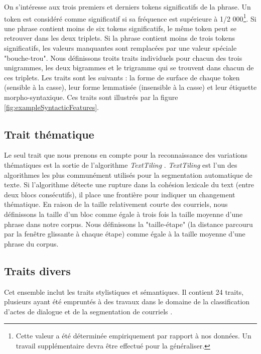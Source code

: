 On s'intéresse aux trois premiers et derniers tokens significatifs de la phrase. Un token est considéré comme significatif si sa fréquence est supérieure à 1/2 000\footnote{Cette valeur a été déterminée empiriquement par rapport à nos données. Un travail supplémentaire devra être effectué pour la généraliser.}. Si une phrase contient moins de six tokens significatifs, le même token peut se retrouver dans les deux triplets. Si la phrase contient moins de trois tokens significatifs, les valeurs manquantes sont remplacées par une valeur spéciale "bouche-trou". Nous définissons troits traits individuels pour chacun des trois unigrammes, les deux bigrammes et le trigramme qui se trouvent dans chacun de ces triplets. Les traits sont les suivants : la forme de surface de chaque token (sensible à la casse), leur forme lemmatisée (insensible à la casse) et leur étiquette morpho-syntaxique. Ces traits sont illustrés par la figure \ref{fig:exampleSyntacticFeatures}.

\subsection{Trait thématique}

Le seul trait que nous prenons en compte pour la reconnaissance des variations thématiques est la sortie de l'algorithme \textit{TextTiling} \cite{hearst1997texttiling}. \textit{TextTiling} est l'un des algorithmes les plus communément utilisés pour la segmentation automatique de texte. Si l'algorithme détecte une rupture dans la cohésion lexicale du text (entre deux blocs consécutifs), il place une frontière pour indiquer un changement thématique. En raison de la taille relativement courte des courriels, nous définissons la taille d'un bloc comme égale à trois fois la taille moyenne d'une phrase dans notre corpus. Nous définissons la "taille-étape" (la distance parcouru par la fenêtre glissante à chaque étape) comme égale à la taille moyenne d'une phrase du corpus.

\subsection{Traits divers}

Cet ensemble inclut les traits stylistiques et sémantiques. Il contient 24 traits, plusieurs ayant été empruntés à des travaux dans le domaine de la classification d'actes de dialogue \cite{qadir2011classifying} et de la segmentation de courriels \cite{lampert2009segmenting}. 

